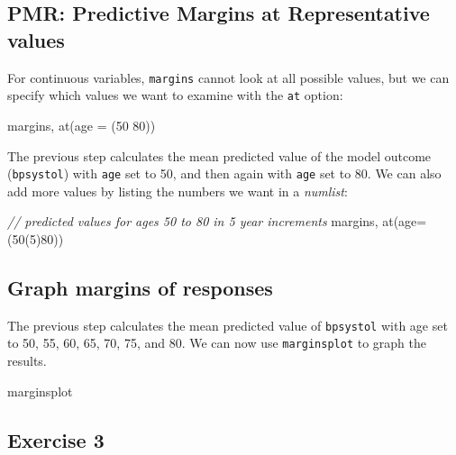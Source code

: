 \documentclass[
]{book}
\newenvironment{Shaded}{\begin{snugshade}}{\end{snugshade}}
\newcommand{\CommentTok}[1]{\textcolor[rgb]{0.56,0.35,0.01}{\textit{#1}}}
\newcommand{\FunctionTok}[1]{\textcolor[rgb]{0.00,0.00,0.00}{#1}}
\newcommand{\NormalTok}[1]{#1}
\begin{document}
\hypertarget{pmr-predictive-margins-at-representative-values}{%
\subsection{PMR: Predictive Margins at Representative values}\label{pmr-predictive-margins-at-representative-values}}

For continuous variables, \texttt{margins} cannot look at all possible values, but we can specify which values we want to examine with the \texttt{at} option:

\begin{Shaded}
\begin{Highlighting}[]
\NormalTok{margins, }\FunctionTok{at}\NormalTok{(age = (50 80))}
\end{Highlighting}
\end{Shaded}

The previous step calculates the mean predicted value of the model outcome (\texttt{bpsystol}) with \texttt{age} set to 50, and then again with \texttt{age} set to 80. We can also add more values by listing the numbers we want in a \emph{numlist}:

\begin{Shaded}
\begin{Highlighting}[]
\CommentTok{// predicted values for ages 50 to 80 in 5 year increments}
\NormalTok{margins, }\FunctionTok{at}\NormalTok{(age=(50(5)80))}
\end{Highlighting}
\end{Shaded}

\hypertarget{graph-margins-of-responses}{%
\subsection{Graph margins of responses}\label{graph-margins-of-responses}}

The previous step calculates the mean predicted value of \texttt{bpsystol} with age set to 50, 55, 60, 65, 70, 75, and 80. We can now use \texttt{marginsplot} to graph the results.

\begin{Shaded}
\begin{Highlighting}[]
\NormalTok{marginsplot}
\end{Highlighting}
\end{Shaded}

\hypertarget{exercise-3-5}{%
\subsection{Exercise 3}\label{exercise-3-5}}
\end{document}
